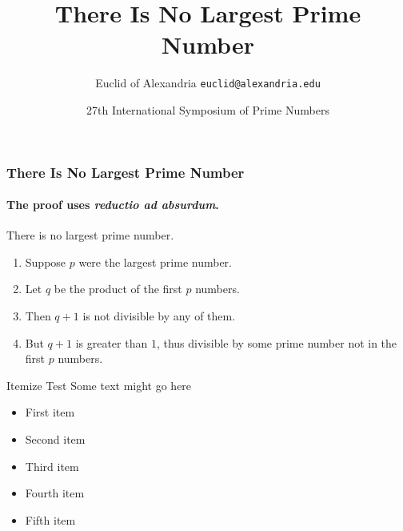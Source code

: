 \documentclass{beamer}
\title{There Is No Largest Prime Number}
\date[ISPN '80]{27th International Symposium of Prime Numbers}
\author[Euclid]{Euclid of Alexandria \texttt{euclid@alexandria.edu}}
\begin{document}
\begin{frame}
\titlepage
\end{frame}

\begin{frame}
\frametitle{There Is No Largest Prime Number} 
\framesubtitle{The proof uses \textit{reductio ad absurdum}.} 
\begin{theorem}
There is no largest prime number. \end{theorem} 
\begin{enumerate} 
\item<1-| alert@1> Suppose $p$ were the largest prime number. 
\item<2-> Let $q$ be the product of the first $p$ numbers. 
\item<3-> Then $q+1$ is not divisible by any of them. 
\item<1-> But $q + 1$ is greater than $1$, thus divisible by some prime
number not in the first $p$ numbers.
\end{enumerate}
\end{frame}

\begin{frame}{Itemize Test}
Some text might go here
\begin{itemize}
\vfill\item First item
\vfill\item Second item
\vfill\item Third item
\vfill\item Fourth item
\vfill\item Fifth item
\end{itemize}
\end{frame}

\begin{comment}
\begin{frame}{Full Page Itemize Test}
Some text might go here
\begin{fullpageitemize}
\vfill\item First item
\vfill\item Second item
\vfill\item Third item
\vfill\item Fourth item
\vfill\item Fifth item
\end{fullpageitemize}
\end{frame}
\end{comment}
\end{document}
